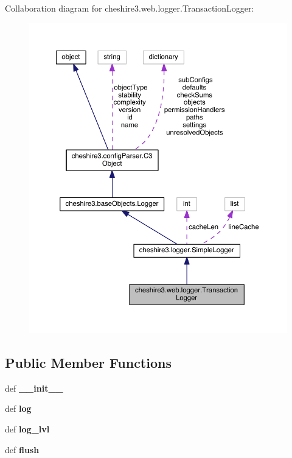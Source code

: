 Collaboration diagram for cheshire3.\-web.\-logger.\-Transaction\-Logger\-:
\nopagebreak
\begin{figure}[H]
\begin{center}
\leavevmode
\includegraphics[width=350pt]{classcheshire3_1_1web_1_1logger_1_1_transaction_logger__coll__graph}
\end{center}
\end{figure}
\subsection*{Public Member Functions}
\begin{DoxyCompactItemize}
\item 
\hypertarget{classcheshire3_1_1web_1_1logger_1_1_transaction_logger_af7e04021c213956c8cb81f49d5794544}{def {\bfseries \-\_\-\-\_\-init\-\_\-\-\_\-}}\label{classcheshire3_1_1web_1_1logger_1_1_transaction_logger_af7e04021c213956c8cb81f49d5794544}

\item 
\hypertarget{classcheshire3_1_1web_1_1logger_1_1_transaction_logger_ac2ee6fa99e07f75e312d841220a880bc}{def {\bfseries log}}\label{classcheshire3_1_1web_1_1logger_1_1_transaction_logger_ac2ee6fa99e07f75e312d841220a880bc}

\item 
\hypertarget{classcheshire3_1_1web_1_1logger_1_1_transaction_logger_a1da132009307921780abcac90a9c8c98}{def {\bfseries log\-\_\-lvl}}\label{classcheshire3_1_1web_1_1logger_1_1_transaction_logger_a1da132009307921780abcac90a9c8c98}

\item 
\hypertarget{classcheshire3_1_1web_1_1logger_1_1_transaction_logger_a8baba8ef1a17de66c847280a7dead46e}{def {\bfseries flush}}\label{classcheshire3_1_1web_1_1logger_1_1_transaction_logger_a8baba8ef1a17de66c847280a7dead46e}

\end{DoxyCompactItemize}
